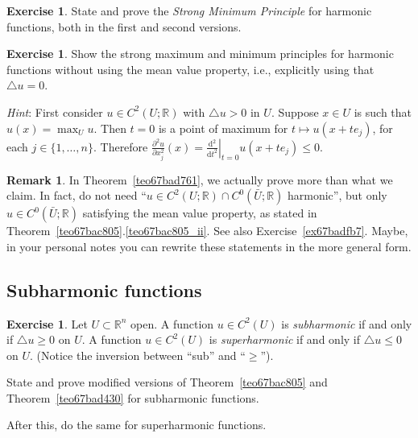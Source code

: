 \documentclass[a4paper,9pt]{amsart}
\newcommand{\R}{\mathbb{R}}	%
\newcommand{\diff}{\mathrm{d}}	%
\newcommand{\de}{\partial}		%
\newcommand{\laplacian}{\triangle}
\newcommand{\angryface}{}
\theoremstyle{plain}
\theoremstyle{definition}
\newtheorem{remark}[proposition]{Remark}
\newtheorem{exercise}[proposition]{Exercise}%
\theoremstyle{remark}
\begin{document}
\begin{exercise}
	State and prove the \emph{Strong Minimum Principle} for harmonic functions, both in the first and second versions.
\end{exercise}

\begin{exercise}\angryface
	Show the strong maximum and minimum principles for harmonic functions without using the mean value property, i.e., explicitly using that $\laplacian u=0$.
	
	{\it Hint}:
	First consider $u\in C^2(U;\R)$ with $\laplacian u>0$ in $U$.
	Suppose $x\in U$ is such that $u(x) = \max_Uu$.
	Then $t=0$ is a point of maximum for $t\mapsto u(x+te_j)$, 
	for each $j\in\{1,\dots,n\}$.
	Therefore $\frac{\de^2u}{\de x_j^2}(x) = \left.\frac{\diff^2}{\diff t^2}\right|_{t=0}u(x+te_j) \le 0$.
\end{exercise}

\begin{remark}
	In Theorem~\ref{teo67bad761}, we actually prove more than what we claim.
	In fact, do not need ``$u\in C^2(U;\R)\cap C^0(\bar U;\R)$ harmonic'', 
	but only $u\in C^0(\bar U;\R)$ satisfying the mean value property, as stated in
	Theorem~\ref{teo67bac805}.\ref{teo67bac805_ii}.	
	See also Exercise~\ref{ex67badfb7}.
	Maybe, in your personal notes you can rewrite these statements in the more general form.
\end{remark}

\subsection{Subharmonic functions}\label{subs67bae229}


\begin{exercise}
	Let $U\subset\R^n$ open.
	A function $u\in C^2(U)$ is \emph{subharmonic} if and only if $\laplacian u\ge 0$ on $U$.
	A function $u\in C^2(U)$ is \emph{superharmonic} if and only if $\laplacian u\le 0$ on $U$.
	(Notice the inversion between ``sub'' and ``$\ge$'').

	State and prove modified versions of Theorem~\ref{teo67bac805} 
	and Theorem~\ref{teo67bad430}
	for subharmonic functions.
	
	After this, do the same for superharmonic functions.
\end{exercise}
\end{document}
